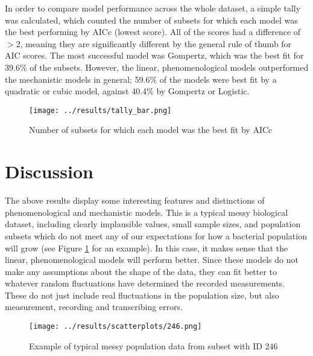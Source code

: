 \documentclass[11pt,a4wide,titlepage]{article}
\begin{document}
In order to compare model performance across the whole dataset, a simple tally was calculated, which counted the number of subsets for which each model was the best performing by AICc (lowest score). All of the scores had a difference of $>2$, meaning they are significantly different by the general rule of thumb for AIC scores. The most successful model was Gompertz, which was the best fit for 39.6\% of the subsets. However, the linear, phenomenological models outperformed the mechanistic models in general; 59.6\% of the models were best fit by a quadratic or cubic model, against 40.4\% by Gompertz or Logistic.


\begin{center}
	\begin{figure}[H]
		\texttt{[image: ../results/tally\_bar.png]}\\
		\caption{Number of subsets for which each model was the best fit by AICc}
	\end{figure}
\end{center}



\section*{Discussion}
The above results display some interesting features and distinctions of phenomenological and mechanistic models. This  is a typical messy biological dataset, including clearly implausible values, small sample sizes, and population subsets which do not meet any of our expectations for how a bacterial population will grow (see Figure \ref{Messy} for an example). In this case, it makes sense that the linear, phenomenological models will perform better. Since these models do not make any assumptions about the shape of the data, they can fit better to whatever random fluctuations have determined the recorded measurements. These do not just include real fluctuations in the population size, but also measurement, recording and transcribing errors. 

\begin{center}
	\begin{figure}
		\texttt{[image: ../results/scatterplots/246.png]}\\
		\caption{Example of typical messy population data from subset with ID 246}\label{Messy}
	\end{figure}
\end{center}
\end{document}
